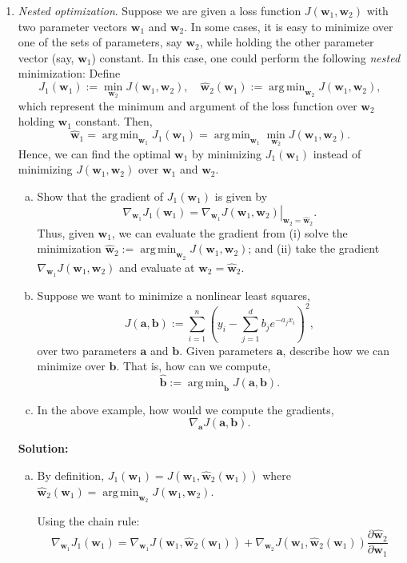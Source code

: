 \documentclass[11pt]{article}
\def\argmin{\mathop{\mathrm{arg\,min}}}
\newcommand{\abf}{\mathbf{a}}
\newcommand{\bbf}{\mathbf{b}}
\newcommand{\wbf}{\mathbf{w}}
\newcommand{\wbfhat}{\widehat{\mathbf{w}}}
\begin{document}
\begin{enumerate}
\item \emph{Nested optimization}.  Suppose we are given a loss function
$J(\wbf_1,\wbf_2)$ with two parameter vectors $\wbf_1$ and $\wbf_2$.
In some cases, it is easy to minimize over one of the sets of parameters, say
$\wbf_2$, while holding the other parameter vector (say, $\wbf_1$) constant.
In this case, one could perform the following \emph{nested} minimization:
Define
\[
    J_1(\wbf_1) := \min_{\wbf_2} J(\wbf_1,\wbf_2), \quad
    \wbfhat_2(\wbf_1) := \argmin_{\wbf_2} J(\wbf_1,\wbf_2),
\]
which represent the minimum and argument of the loss function over $\wbf_2$
holding $\wbf_1$ constant.   Then,
\[
    \wbfhat_1 = \argmin_{\wbf_1} J_1(\wbf_1) = \argmin_{\wbf_1} \min_{\wbf_2}
    J(\wbf_1,\wbf_2).
\]
Hence, we can find the optimal $\wbf_1$ by minimizing $J_1(\wbf_1)$
instead of minimizing $J(\wbf_1,\wbf_2)$ over $\wbf_1$ and $\wbf_2$.
\begin{enumerate}[(a)]
\item Show that the gradient of $J_1(\wbf_1)$ is given by
\[
    \nabla_{\wbf_1} J_1(\wbf_1) = \left. \nabla_{\wbf_1} J(\wbf_1,\wbf_2)\right|_{\wbf_2=\wbfhat_2}.
\]
Thus, given $\wbf_1$, we can evaluate the gradient from (i) solve the minimization
$\wbfhat_2:= \argmin_{\wbf_2} J(\wbf_1,\wbf_2)$; and (ii) take the gradient
$\nabla_{\wbf_1} J(\wbf_1,\wbf_2)$ and evaluate at $\wbf_2 = \wbfhat_2$.

\item Suppose we want to minimize a nonlinear least squares,
\[
    J(\abf,\bbf) := \sum_{i=1}^n \left( y_i -
        \sum_{j=1}^d b_j e^{-a_jx_i} \right)^2,
\]
over two parameters $\abf$ and $\bbf$.  Given parameters $\abf$,
describe how we can minimize over $\bbf$.  That is, how can we compute,
\[
    \hat{\bbf} := \argmin_{\bbf} J(\abf,\bbf).
\]

\item In the above example, how would we compute the gradients,
\[
    \nabla_\abf J(\abf,\bbf).
\]

\end{enumerate}

\textbf{Solution:}
\begin{enumerate}[(a)]
\item By definition, $J_1(\wbf_1) = J(\wbf_1, \wbfhat_2(\wbf_1))$ where $\wbfhat_2(\wbf_1) = \argmin_{\wbf_2} J(\wbf_1,\wbf_2)$.

Using the chain rule:
$$\nabla_{\wbf_1} J_1(\wbf_1) = \nabla_{\wbf_1} J(\wbf_1, \wbfhat_2(\wbf_1)) + \nabla_{\wbf_2} J(\wbf_1, \wbfhat_2(\wbf_1)) \frac{\partial \wbfhat_2}{\partial \wbf_1}$$


\end{enumerate}
\end{enumerate}
\end{document}
